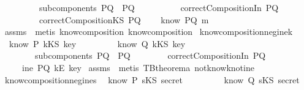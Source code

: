 \begin{isabellebody}
\ \ \ \ \ \ \ \ \ {\isachardoublequoteopen}subcomponents\ PQ\ {\isacharequal}\ {\isacharbraceleft}P{\isacharcomma}Q{\isacharbraceright}{\isachardoublequoteclose}\ \isanewline
\ \ \ \ \ \ \ \ \ {\isachardoublequoteopen}correctCompositionIn\ PQ{\isachardoublequoteclose}\isanewline
\ \ \ \ \ \ \ \ \ {\isachardoublequoteopen}correctCompositionKS\ PQ{\isachardoublequoteclose}\isanewline
{}\ \ \ \ {\isachardoublequoteopen}know\ PQ\ m{\isachardoublequoteclose}\isanewline
\isadelimproof
\endisadelimproof
\isatagproof
{}\isamarkupfalse \ assms\ \isamarkupfalse \ {\isacharparenleft}metis\ know{\isacharunderscore}composition{}\ know{\isacharunderscore}composition{}{\isacharparenright}\endisatagproof
{\isafoldproof}\isadelimproof
\isanewline
\endisadelimproof
\isanewline
{}\isamarkupfalse \ know{\isacharunderscore}composition{\isacharunderscore}neg{\isacharunderscore}ine{\isacharunderscore}k{\isacharcolon}\isanewline
{}\ {\isachardoublequoteopen}{\isasymnot}\ know\ P\ {\isacharparenleft}kKS\ key{\isacharparenright}{\isachardoublequoteclose}\isanewline
\ \ \ \ \ \ \ \ {\isachardoublequoteopen}{\isasymnot}\ know\ Q\ {\isacharparenleft}kKS\ key{\isacharparenright}{\isachardoublequoteclose}\isanewline
\ \ \ \ \ \ \ \ {\isachardoublequoteopen}subcomponents\ PQ\ {\isacharequal}\ {\isacharbraceleft}P{\isacharcomma}Q{\isacharbraceright}{\isachardoublequoteclose}\isanewline
\ \ \ \ \ \ \ \ {\isachardoublequoteopen}correctCompositionIn\ PQ{\isachardoublequoteclose}\isanewline
{}\ \ \ \ {\isachardoublequoteopen}{\isasymnot}\ {\isacharparenleft}ine\ PQ\ {\isacharparenleft}kE\ key{\isacharparenright}{\isacharparenright}{\isachardoublequoteclose}\isanewline
\isadelimproof
\endisadelimproof
\isatagproof
{}\isamarkupfalse \ assms\ \isamarkupfalse \ {\isacharparenleft}metis\ TBtheorem{}a\ not{\isacharunderscore}know{\isacharunderscore}k{\isacharunderscore}not{\isacharunderscore}ine{\isacharparenright}\endisatagproof
{\isafoldproof}\isadelimproof
\isanewline
\endisadelimproof
\isanewline
{}\isamarkupfalse \ know{\isacharunderscore}composition{\isacharunderscore}neg{\isacharunderscore}ine{\isacharunderscore}s{\isacharcolon}\isanewline
{}\ {\isachardoublequoteopen}{\isasymnot}\ know\ P\ {\isacharparenleft}sKS\ secret{\isacharparenright}{\isachardoublequoteclose}\isanewline
\ \ \ \ \ \ \ \ {\isachardoublequoteopen}{\isasymnot}\ know\ Q\ {\isacharparenleft}sKS\ secret{\isacharparenright}{\isachardoublequoteclose}\isanewline

\end{isabellebody}
